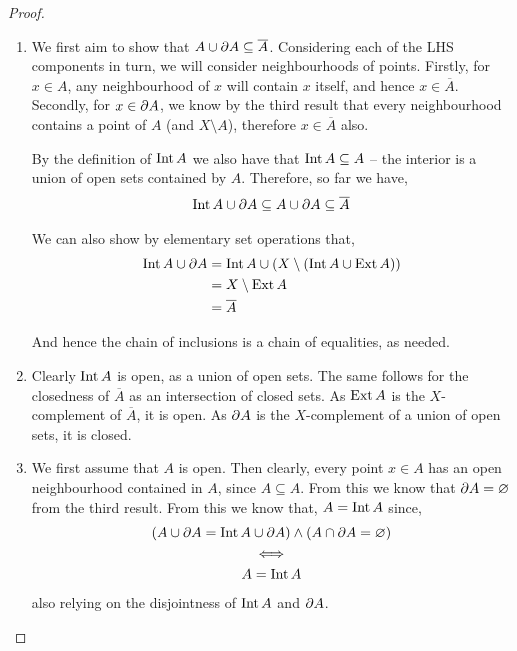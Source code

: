\begin{proposition}
\begin{proof}
\begin{enumerate}
			\item We first aim to show that $ A \cup \operatorname{\partial\!}{A} \subseteq \overline{A} $. Considering each of the LHS components in turn, we will consider neighbourhoods of points. Firstly, for $ x \in A $, any neighbourhood of $ x $ will contain $ x $ itself, and hence $ x \in \overline{A} $. Secondly, for $ x \in \operatorname{\partial\!}{A} $, we know by the third result that every neighbourhood contains a point of $ A $ (and $ X \setminus A $), therefore $ x \in \overline{A} $ also.

			      By the definition of $ \operatorname{Int}{A} $ we also have that $ \operatorname{Int}{A} \subseteq A $ -- the interior is a union of open sets contained by $ A $. Therefore, so far we have,
			      \begin{align*}
				      \operatorname{Int}{A} \cup \operatorname{\partial\!}{A} \subseteq A \cup \operatorname{\partial\!}{A} \subseteq \overline{A}
			      \end{align*}

			      We can also show by elementary set operations that,
			      \begin{align*}
				      \operatorname{Int}{A} \cup \operatorname{\partial\!}{A} & = \operatorname{Int}{A} \cup ( X \setminus ( \operatorname{Int}{A} \cup \operatorname{Ext}{A} ) ) \\
				                                     & = X \setminus \operatorname{Ext}{A}                                             \\
				                                     & = \overline{A}
			      \end{align*}

			      And hence the chain of inclusions is a chain of equalities, as needed.

			\item Clearly $ \operatorname{Int}{A} $ is open, as a union of open sets. The same follows for the closedness of $ \overline{A} $ as an intersection of closed sets. As $ \operatorname{Ext}{A} $ is the $ X $-complement of $ \overline{A} $, it is open. As $ \operatorname{\partial\!}{A} $ is the $ X $-complement of a union of open sets, it is closed.

			\item We first assume that $ A $ is open. Then clearly, every point $ x \in A $ has an open neighbourhood contained in $ A $, since $ A \subseteq A $. From this we know that $ \operatorname{\partial\!}{A} = \varnothing $ from the third result. From this we know that, $ A = \operatorname{Int}{A} $ since,
			      \begin{gather*}
				      (A \cup \operatorname{\partial\!}{A} = \operatorname{Int}{A} \cup \operatorname{\partial\!}{A}) \land ( A \cap \operatorname{\partial\!}{A} = \varnothing )\\
				      \iff \\
				      A = \operatorname{Int}{A}
			      \end{gather*}
			      also relying on the disjointness of $ \operatorname{Int}{A} $ and $ \operatorname{\partial\!}{A} $.


\end{enumerate}
\end{proof}
\end{proposition}
